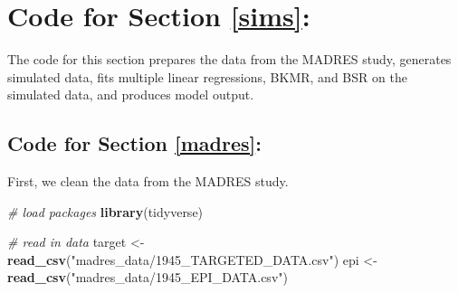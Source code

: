 \documentclass[12pt, twoside]{amherstthesis}
\newenvironment{Shaded}{\begin{snugshade}}{\end{snugshade}}
\newcommand{\CommentTok}[1]{\textcolor[rgb]{0.56,0.35,0.01}{\textit{#1}}}
\newcommand{\FunctionTok}[1]{\textcolor[rgb]{0.13,0.29,0.53}{\textbf{#1}}}
\newcommand{\NormalTok}[1]{#1}
\newcommand{\OtherTok}[1]{\textcolor[rgb]{0.56,0.35,0.01}{#1}}
\newcommand{\StringTok}[1]{\textcolor[rgb]{0.31,0.60,0.02}{#1}}
\begin{document}
\hypertarget{code-for-section-refsims}{%
\section{Code for Section \ref{sims}:}\label{code-for-section-refsims}}

The code for this section prepares the data from the MADRES study, generates simulated data, fits multiple linear regressions, BKMR, and BSR on the simulated data, and produces model output.

\hypertarget{code-for-section-refmadres}{%
\subsection{Code for Section \ref{madres}:}\label{code-for-section-refmadres}}

First, we clean the data from the MADRES study.

\scriptsize
\begin{Shaded}
\begin{Highlighting}[]
\CommentTok{\# load packages}
\FunctionTok{library}\NormalTok{(tidyverse)}
\end{Highlighting}
\end{Shaded}
\normalsize

\scriptsize
\begin{Shaded}
\begin{Highlighting}[]
\CommentTok{\# read in data}
\NormalTok{target }\OtherTok{\textless{}{-}} \FunctionTok{read\_csv}\NormalTok{(}\StringTok{"madres\_data/1945\_TARGETED\_DATA.csv"}\NormalTok{)}
\NormalTok{epi }\OtherTok{\textless{}{-}} \FunctionTok{read\_csv}\NormalTok{(}\StringTok{"madres\_data/1945\_EPI\_DATA.csv"}\NormalTok{)}
\end{Highlighting}
\end{Shaded}
\normalsize
\end{document}
